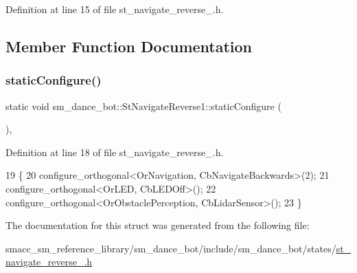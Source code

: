 Definition at line 15 of file st\+\_\+navigate\+\_\+reverse\+\_.\+h.



\subsection{Member Function Documentation}
\mbox{\label{structsm__dance__bot_1_1StNavigateReverse1_a27ad6ec4e54e4b4acc676fdb3948849e}} 
\subsubsection{\texorpdfstring{static\+Configure()}{staticConfigure()}}
{\footnotesize\ttfamily static void sm\+\_\+dance\+\_\+bot\+::\+St\+Navigate\+Reverse1\+::static\+Configure (\begin{DoxyParamCaption}{ }\end{DoxyParamCaption})\hspace{0.3cm}{\ttfamily [inline]}, {\ttfamily [static]}}



Definition at line 18 of file st\+\_\+navigate\+\_\+reverse\+\_.\+h.


\begin{DoxyCode}
19    \{
20       configure\_orthogonal<OrNavigation, CbNavigateBackwards>(2);
21       configure\_orthogonal<OrLED, CbLEDOff>();
22       configure\_orthogonal<OrObstaclePerception, CbLidarSensor>();
23    \}
\end{DoxyCode}


The documentation for this struct was generated from the following file\+:\begin{DoxyCompactItemize}
\item 
smacc\+\_\+sm\+\_\+reference\+\_\+library/sm\+\_\+dance\+\_\+bot/include/sm\+\_\+dance\+\_\+bot/states/\hyperlink{sm__dance__bot_2include_2sm__dance__bot_2states_2st__navigate__reverse__1_8h}{st\+\_\+navigate\+\_\+reverse\+\_.\+h}\end{DoxyCompactItemize}
